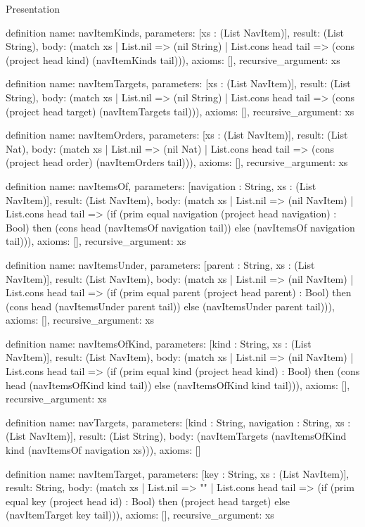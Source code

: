 \begin{lexlean}{Presentation}
\begin{semanticmodule}
definition{
  name: navItemKinds,
  parameters: [xs : (List NavItem)],
  result: (List String),
  body: (match xs
    | List.nil => (nil String)
    | List.cons head tail => (cons (project head kind) (navItemKinds tail))),
  axioms: [],
  recursive_argument: xs
}

definition{
  name: navItemTargets,
  parameters: [xs : (List NavItem)],
  result: (List String),
  body: (match xs
    | List.nil => (nil String)
    | List.cons head tail => (cons (project head target) (navItemTargets tail))),
  axioms: [],
  recursive_argument: xs
}

definition{
  name: navItemOrders,
  parameters: [xs : (List NavItem)],
  result: (List Nat),
  body: (match xs
    | List.nil => (nil Nat)
    | List.cons head tail => (cons (project head order) (navItemOrders tail))),
  axioms: [],
  recursive_argument: xs
}

definition{
  name: navItemsOf,
  parameters: [navigation : String, xs : (List NavItem)],
  result: (List NavItem),
  body: (match xs
    | List.nil => (nil NavItem)
    | List.cons head tail => (if (prim equal navigation (project head navigation) : Bool) then (cons head (navItemsOf navigation tail)) else (navItemsOf navigation tail))),
  axioms: [],
  recursive_argument: xs
}

definition{
  name: navItemsUnder,
  parameters: [parent : String, xs : (List NavItem)],
  result: (List NavItem),
  body: (match xs
    | List.nil => (nil NavItem)
    | List.cons head tail => (if (prim equal parent (project head parent) : Bool) then (cons head (navItemsUnder parent tail)) else (navItemsUnder parent tail))),
  axioms: [],
  recursive_argument: xs
}

definition{
  name: navItemsOfKind,
  parameters: [kind : String, xs : (List NavItem)],
  result: (List NavItem),
  body: (match xs
    | List.nil => (nil NavItem)
    | List.cons head tail => (if (prim equal kind (project head kind) : Bool) then (cons head (navItemsOfKind kind tail)) else (navItemsOfKind kind tail))),
  axioms: [],
  recursive_argument: xs
}

definition{
  name: navTargets,
  parameters: [kind : String, navigation : String, xs : (List NavItem)],
  result: (List String),
  body: (navItemTargets (navItemsOfKind kind (navItemsOf navigation xs))),
  axioms: []
}

definition{
  name: navItemTarget,
  parameters: [key : String, xs : (List NavItem)],
  result: String,
  body: (match xs
    | List.nil => ""
    | List.cons head tail => (if (prim equal key (project head id) : Bool) then (project head target) else (navItemTarget key tail))),
  axioms: [],
  recursive_argument: xs
}


\end{semanticmodule}
\end{lexlean}
